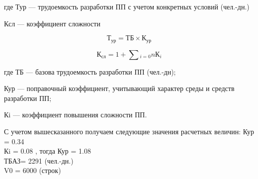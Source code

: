 \begin{ESKDexplanation}
    \item[где ]{} Тур --- трудоемкость разработки ПП с учетом конкретных условий (чел.-дн.)
    \item{} Ксл --- коэффициент сложности 
\end{ESKDexplanation}

\begin{equation}
    Т_{ур} = ТБ \times{} К_{ур}
\end{equation}

\begin{equation}
    К_{сл} = 1 + \sum{}_{i=0}{n}К_i
\end{equation}

\begin{ESKDexplanation}
    \item[где ]{} ТБ --- базова трудоемкость разработки ПП (чел.-дн);
    \item{} Кур --- поправочный коэффициент, учитывающий характер среды и средств разработки ПП;
    \item{} Кi --- коэффициент повышения сложности ПП.
\end{ESKDexplanation}

С учетом вышесказанного получаем следующие значения расчетных величин:
    Кур = 0.34 \\
    Кi  =  0.08 ,  тогда  Кур = 1.08 \\
    ТБАЗ=  2291 (чел.-дн.) \\
    V0  =  6000 (строк) \\




